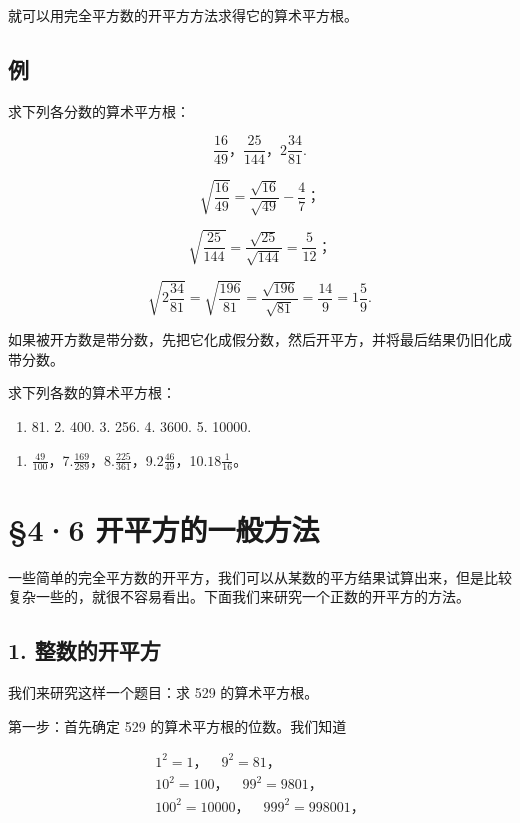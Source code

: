 就可以用完全平方数的开平方方法求得它的算术平方根。

\subsection{例}

求下列各分数的算术平方根：

\[
\frac{16}{49}\text{，} \frac{25}{144}\text{，} 2 \frac{34}{81}.
\]


\[
\sqrt {\frac{16}{49}} = \frac{\sqrt {16}}{\sqrt {49}} - \frac{4}{7}\text{；}
\]

\[
\sqrt {\frac{25}{144}} = \frac{\sqrt {25}}{\sqrt {144}} = \frac{5}{12}\text{；}
\]

\[
\sqrt {2 \frac{34}{81}} = \sqrt {\frac{196}{81}} = \frac{\sqrt {196}}{\sqrt {81}} = \frac{14}{9} = 1 \frac{5}{9}.
\]

如果被开方数是带分数，先把它化成假分数，然后开平方，并将最后结果仍旧化成带分数。

求下列各数的算术平方根：

\begin{enumerate}
\item
  81. 2. 400. 3. 256. 4. 3600. 5. 10000.
\end{enumerate}

\begin{enumerate}[start=6]
\item
  \(\frac{49}{100}\)，7.\(\frac{169}{289}\)，8.\(\frac{225}{361}\)，9.\(2\frac{46}{49}\)，10.\(18\frac{1}{16}\)。
\end{enumerate}

\section{§4·6 开平方的一般方法}

一些简单的完全平方数的开平方，我们可以从某数的平方结果试算出来，但是比较复杂一些的，就很不容易看出。下面我们来研究一个正数的开平方的方法。

\subsection{1. 整数的开平方}

我们来研究这样一个题目：求 529 的算术平方根。

第一步：首先确定 529 的算术平方根的位数。我们知道

\[
\begin{array}{l} 1 ^ {2} = 1\text{，} \quad 9 ^ {2} = 81\text{，} \\ 10 ^ {2} = 100\text{，} \quad 99 ^ {2} = 9801\text{，} \\ 100 ^ {2} = 10000\text{，} \quad 999 ^ {2} = 998001\text{，} \\ \end{array}
\]

